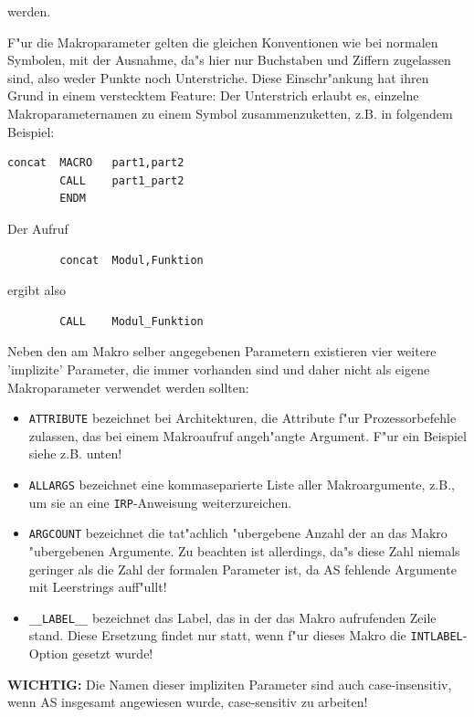 \documentclass[12pt,a4paper,twoside]{report}
\newcommand{\asname}{AS}
\begin{document}
werden.
\par
F"ur die Makroparameter gelten die gleichen Konventionen wie bei
normalen Symbolen, mit der Ausnahme, da"s hier nur Buchstaben
und Ziffern zugelassen sind, also weder Punkte noch
Unterstriche. Diese Einschr"ankung hat ihren Grund in einem
verstecktem Feature: Der Unterstrich erlaubt es, einzelne
Makroparameternamen zu einem Symbol zusammenzuketten, z.B. in
folgendem Beispiel:
\begin{verbatim}
concat  MACRO   part1,part2
        CALL    part1_part2
        ENDM
\end{verbatim}
Der Aufruf
\begin{verbatim}
        concat  Modul,Funktion
\end{verbatim}
ergibt also
\begin{verbatim}
        CALL    Modul_Funktion
\end{verbatim}
\par
Neben den am Makro selber angegebenen Parametern existieren vier weitere
'implizite' Parameter, die immer vorhanden sind und daher nicht als eigene
Makroparameter verwendet werden sollten:
\begin{itemize}
\item{{\tt ATTRIBUTE} bezeichnet bei Architekturen, die Attribute f"ur
      Prozessorbefehle zulassen, das bei einem Makroaufruf angeh"angte
      Argument.  F"ur ein Beispiel siehe z.B. unten!}
\item{{\tt ALLARGS} bezeichnet eine kommaseparierte Liste aller
      Makroargumente, z.B., um sie an eine {\tt IRP}-Anweisung
      weiterzureichen.}
\item{{\tt ARGCOUNT} bezeichnet die tat"achlich "ubergebene Anzahl der
      an das Makro "ubergebenen Argumente.  Zu beachten ist allerdings,
      da"s diese Zahl niemals geringer als die Zahl der formalen Parameter
      ist, da \asname{} fehlende Argumente mit Leerstrings auff"ullt!}
\item{{\tt \_\_LABEL\_\_} bezeichnet das Label, das in der das Makro aufrufenden
      Zeile stand.  Diese Ersetzung findet nur statt, wenn f"ur dieses
      Makro die {\tt INTLABEL}-Option gesetzt wurde!}
\end{itemize}
{\bf WICHTIG:} Die Namen dieser impliziten Parameter sind auch
case-insensitiv, wenn \asname{} insgesamt angewiesen wurde, case-sensitiv
zu arbeiten!
\end{document}

